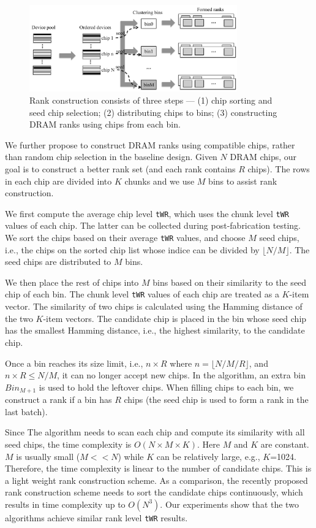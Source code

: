 \begin{figure}[ht]
\centering
\includegraphics[width=0.8\textwidth]{figures/device_match.pdf}
\caption{Rank construction consists of three steps --- (1) chip sorting and seed chip selection;
(2) distributing chips to bins; (3) constructing DRAM ranks using chips from each bin.}
\label{fig:device_match}
\end{figure}

We further propose to construct DRAM ranks using compatible chips, rather than random chip selection in the baseline design. 
Given $N$ DRAM chips, our goal is to construct a better rank set (and each rank contains $R$ chips). The rows in each chip are divided into $K$ chunks and we use $M$ bins to assist rank construction.

We first compute the average chip level {\tt tWR}, which uses the chunk level {\tt tWR} values of each chip. The latter can be collected during post-fabrication testing.
We sort the chips based on their average {\tt tWR} values, and choose $M$ seed chips, i.e., the chips on the sorted chip list whose indice can be divided by $\lfloor N/M\rfloor$. The seed chips are distributed to $M$ bins.

We then place the rest of chips into $M$ bins based on their similarity to the seed chip of each bin. The chunk level {\tt tWR} values of each chip are treated as a $K$-item vector. The similarity of two chips is calculated using the Hamming distance of the two $K$-item vectors. The candidate chip is placed in the bin whose seed chip has the smallest Hamming distance, i.e., the highest similarity, to the candidate chip.

Once a bin reaches its size limit, i.e., $n\times R$  where $n = \lfloor{N/M/R}\rfloor$, and $n\times R \leq N/M$, it can no longer accept new chips. In the algorithm, an extra bin $Bin_{M+1}$ is used to hold the leftover chips.
When filling chips to each bin, we construct a rank if a bin has $R$ chips (the seed chip is used to form a rank in the last batch). 

Since The algorithm needs to scan each chip and compute its similarity with all seed chips, the time complexity is $O(N\times M \times K)$. Here $M$ and $K$ are constant. $M$ is usually small ($M << N$) while $K$ can be relatively large, e.g., $K$=1024. Therefore, the time complexity is linear to the number of candidate chips. This is a light weight rank construction scheme. As a comparison, 
the recently proposed rank construction scheme \cite{DAC15:radar} needs to sort the candidate chips continuously, which results in time complexity up to $O(N^3)$. Our experiments show that the two algorithms achieve similar rank level {\tt tWR} results. 

